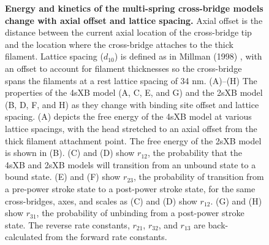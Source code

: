 \documentclass[10pt]{article}
\newcommand{\citep}[1]{\cite{#1}} %
\begin{document}
\begin{figure}[!ht]
    \begin{center}
    \end{center}
    \caption{ \textbf{Energy and kinetics of the multi-spring cross-bridge models change with axial offset and lattice spacing.} 
        Axial offset is the distance between the current axial location of the cross-bridge tip and the location where the cross-bridge attaches to the thick filament.  
        Lattice spacing ($d_{10}$) is defined as in Millman (1998) \protect\citep{Millman1998}, with an offset to account for filament thicknesses so the cross-bridge spans the filaments at a rest lattice spacing of 34 nm. 
        (A)--(H)  The properties of the 4sXB model (A, C, E, and G) and the 2sXB model (B, D, F, and H) as they change with binding site offset and lattice spacing.
        (A) depicts the free energy of the 4sXB model at various lattice spacings, with the head stretched to an axial offset from the thick filament attachment point.
        The free energy of the 2sXB model is shown in (B).  
        (C) and (D) show $r_{12}$, the probability that the 4sXB and 2sXB models will transition from an unbound state to a bound state. 
        (E) and (F) show $r_{23}$, the probability of transition from a pre-power stroke state to a post-power stroke state, for the same cross-bridges, axes, and scales as (C) and (D) show $r_{12}$.
        (G) and (H) show $r_{31}$, the probability of unbinding from a post-power stroke state. 
        The reverse rate constants, $r_{21}$, $r_{32}$, and $r_{13}$ are back-calculated from the forward rate constants.
        }
    \label{fig_kinetics_contours}
\end{figure}
\end{document}
